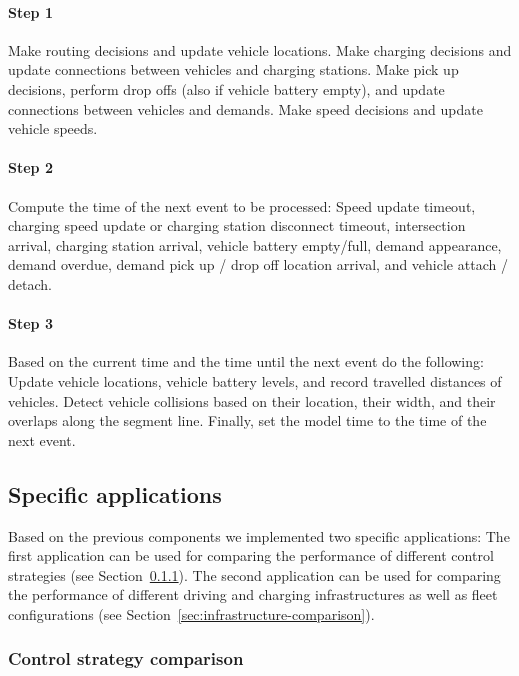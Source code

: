 \documentclass[a4paper,twoside]{article}
\begin{document}
	\paragraph{Step 1}
	
	Make routing decisions and update vehicle locations.
	Make charging decisions and update connections between vehicles and charging stations.
	Make pick up decisions, perform drop offs (also if vehicle battery empty), and update connections between vehicles and demands.
	Make speed decisions and update vehicle speeds.
	
	\paragraph{Step 2}
	
	Compute the time of the next event to be processed:
	Speed update timeout,
	charging speed update or charging station disconnect timeout,
	intersection arrival,
	charging station arrival,
	vehicle battery empty/full,
	demand appearance,
	demand overdue,
	demand pick up / drop off location arrival, and
	vehicle attach / detach.
	
	\paragraph{Step 3}
	
	Based on the current time and the time until the next event do the following:
	Update vehicle locations, vehicle battery levels, and record travelled distances of vehicles.
	Detect vehicle collisions based on their location, their width, and their overlaps along the segment line.
	Finally, set the model time to the time of the next event.
	
	\subsection{Specific applications}
	\label{sec:application}
	
	Based on the previous components we implemented two specific applications:
	The first application can be used for comparing the performance of different control strategies (see Section~\ref{sec:controller-comparison}).
	The second application can be used for comparing the performance of different driving and charging infrastructures as well as fleet configurations (see Section~\ref{sec:infrastructure-comparison}).
	
	\subsubsection{Control strategy comparison}
	\label{sec:controller-comparison}
	
\end{document}

